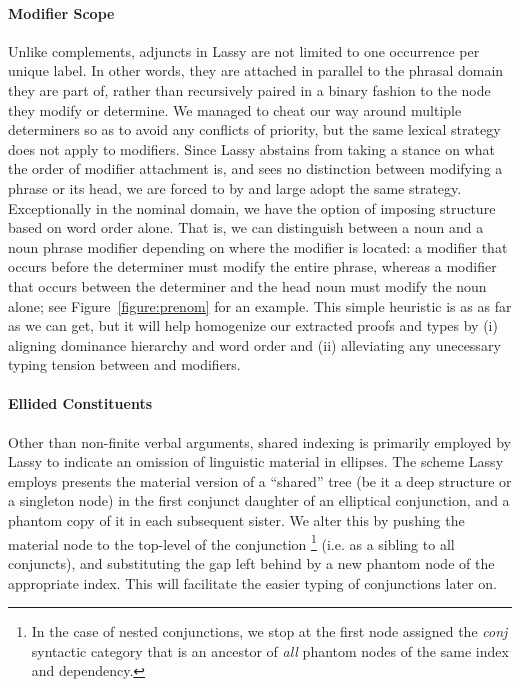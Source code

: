 \paragraph{Modifier Scope}
Unlike complements, adjuncts in Lassy are not limited to one occurrence per unique label.
In other words, they are attached in parallel to the phrasal domain they are part of, rather than recursively paired in a binary fashion to the node they modify or determine.
We managed to cheat our way around multiple determiners so as to avoid any conflicts of priority, but the same lexical strategy does not apply to modifiers.
Since Lassy abstains from taking a stance on what the order of modifier attachment is, and sees no distinction between modifying a phrase or its head, we are forced to by and large adopt the same strategy.
Exceptionally in the nominal domain, we have the option of imposing structure based on word order alone.
That is, we can distinguish between a noun and a noun phrase modifier depending on where the modifier is located: a modifier that occurs before the determiner must modify the entire phrase, whereas a modifier that occurs between the determiner and the head noun must modify the noun alone; see Figure~\ref{figure:prenom} for an example.
This simple heuristic is as as far as we can get, but it will help homogenize our extracted proofs and types by (i) aligning dominance hierarchy and word order and (ii) alleviating any unecessary typing tension between  and  modifiers.

\paragraph{Ellided Constituents}
Other than non-finite verbal arguments, shared indexing is primarily employed by Lassy to indicate an omission of linguistic material in ellipses.
The scheme Lassy employs presents the material version of a ``shared'' tree (be it a deep structure or a singleton node) in the first conjunct daughter of an elliptical conjunction, and a phantom copy of it in each subsequent sister.
We alter this by pushing the material node to the top-level of the conjunction%
		\footnote{In the case of nested conjunctions, we stop at the first node assigned the \textit{conj} syntactic category that is an ancestor of \textit{all} phantom nodes of the same index and dependency.}
(i.e. as a sibling to all conjuncts), and substituting the gap left behind by a new phantom node of the appropriate index.
This will facilitate the easier typing of conjunctions later on.


